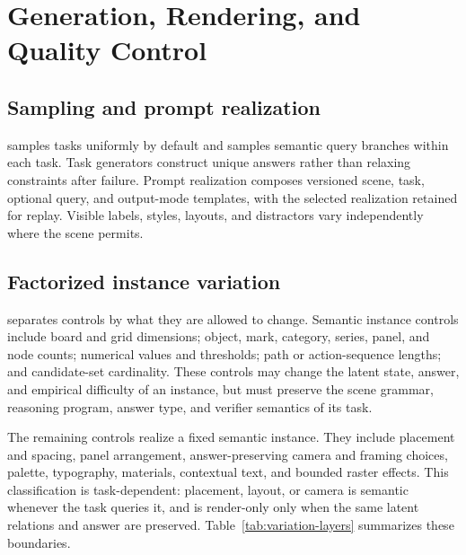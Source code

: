 \section{Generation, Rendering, and Quality Control}
\label{sec:quality}

\subsection{Sampling and prompt realization}

\trace samples tasks uniformly by default and samples semantic query branches
within each task. Task generators construct unique answers rather than
relaxing constraints after failure. Prompt realization composes versioned
scene, task, optional query, and output-mode templates, with the selected
realization retained for replay. Visible labels, styles, layouts, and
distractors vary independently where the scene permits.

\subsection{Factorized instance variation}

\trace separates controls by what they are allowed to change. Semantic
instance controls include board and grid dimensions; object, mark, category,
series, panel, and node counts; numerical values and thresholds; path or
action-sequence lengths; and candidate-set cardinality. These controls may
change the latent state, answer, and empirical difficulty of an instance, but
must preserve the scene grammar, reasoning program, answer type, and verifier
semantics of its task.

The remaining controls realize a fixed semantic instance. They include
placement and spacing, panel arrangement, answer-preserving camera and
framing choices, palette, typography, materials, contextual text, and bounded
raster effects. This classification is task-dependent: placement, layout, or
camera is semantic whenever the task queries it, and is render-only only when
the same latent relations and answer are preserved. Table~\ref{tab:variation-layers}
summarizes these boundaries.


